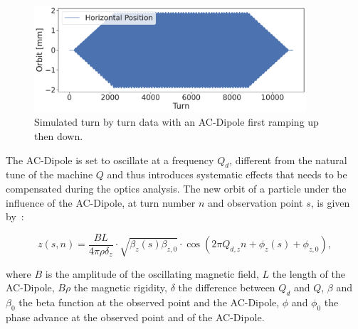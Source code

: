 \begin{figure}
    \center
    \includegraphics[width=0.9\textwidth]{./images/ac_dipole_tbt.pdf}
    \caption{Simulated turn by turn data with an AC-Dipole first ramping up then down.} 
    \label{fig:ac_dipole}
\end{figure}

The AC-Dipole is set to oscillate at a frequency $Q_d$, different from the natural tune of the
machine $Q$ and thus introduces systematic effects that needs to be compensated during the optics
analysis. The new orbit of a particle under the influence of the AC-Dipole, at turn number $n$ and
observation point $s$, is given by~\cite{serrano_lhc_2010}:

\begin{equation}
z(s, n) = \frac{BL}{4\pi\rho\delta_z} \cdot \sqrt{\beta_z(s) \beta_{z,0}} \cdot \cos \left( 2 \pi Q_{d,z}n + \phi_z(s) + \phi_{z,0}\right),
\label{eq:ac_dipole}
\end{equation}

where $B$ is the amplitude of the oscillating magnetic field, $L$ the length of the AC-Dipole,
$B\rho$ the magnetic rigidity, $\delta$ the difference between $Q_d$ and $Q$, $\beta$ and $\beta_0$
the beta function at the observed point and the AC-Dipole, $\phi$ and $\phi_0$ the phase advance at
the observed point and of the AC-Dipole.